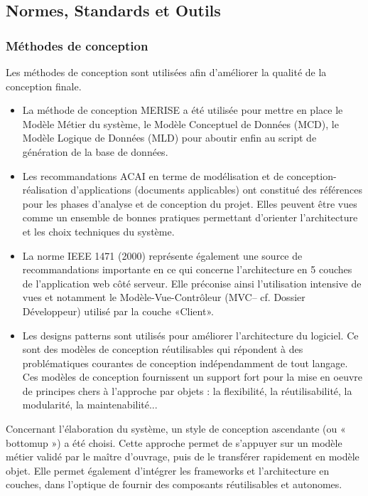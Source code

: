 \documentclass[a4paper,12pt]{report}
\begin{document}
\begin{onehalfspace}
\chapter{Normes, Standards et Outils}

\subsection{Méthodes de conception}
  Les méthodes de conception sont utilisées afin d'améliorer la qualité de la conception finale.

\begin{itemize}
\item La méthode de conception MERISE a été utilisée pour mettre en place le Modèle Métier du système,  le  Modèle Conceptuel de Données (MCD), le  Modèle Logique de Données (MLD)  pour aboutir enfin au script de génération de la base de données.

\item Les recommandations ACAI en terme de modélisation et de conception-réalisation d'applications (documents applicables) ont constitué des références pour les phases d’analyse et de conception du projet. Elles peuvent être vues comme un ensemble de bonnes pratiques permettant d’orienter l’architecture et les choix techniques du système.


\item La  norme IEEE 1471 (2000) représente également une source de recommandations importante en ce qui concerne l’architecture en 5 couches de l’application web côté serveur. Elle préconise ainsi l’utilisation intensive de vues et notamment le Modèle-Vue-Contrôleur (MVC– cf. Dossier Développeur) utilisé par la couche «Client».

\item Les designs patterns sont utilisés pour améliorer l’architecture du logiciel. Ce sont des modèles de conception réutilisables qui répondent à des problématiques courantes de conception indépendamment de tout langage. Ces modèles de conception fournissent un support fort pour la mise en oeuvre de principes chers à l'approche par  objets : la flexibilité, la réutilisabilité, la modularité, la maintenabilité...\\
\end{itemize}

  Concernant l’élaboration du système, un style de conception ascendante (ou « bottomup ») a été choisi. Cette approche permet de s’appuyer sur un modèle métier validé par le maître d’ouvrage, puis de le transférer rapidement en modèle objet. Elle permet également d’intégrer les frameworks et l’architecture en couches, dans l’optique de fournir des composants réutilisables et autonomes.



\end{onehalfspace}
\end{document}
